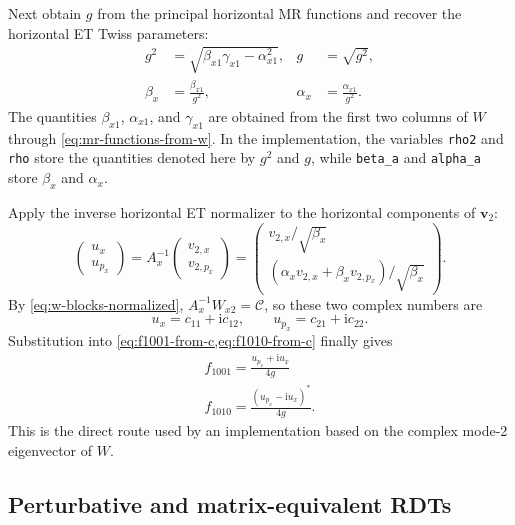 \documentclass[11pt,a4paper]{article}
\newcommand{\ii}{\mathrm{i}}
\newcommand{\mat}[1]{\bm{#1}}
\begin{document}
Next obtain $g$ from the principal horizontal MR functions and recover the
horizontal ET Twiss parameters:
\begin{align}
 g^2
 &=\sqrt{\beta_{x1}\gamma_{x1}-\alpha_{x1}^2},
 &g&=\sqrt{g^2},
 \label{eq:direct-g-from-w}\\
 \beta_x&=\frac{\beta_{x1}}{g^2},
 &\alpha_x&=\frac{\alpha_{x1}}{g^2}.
 \label{eq:direct-et-twiss-from-w}
\end{align}
The quantities $\beta_{x1}$, $\alpha_{x1}$, and $\gamma_{x1}$ are obtained
from the first two columns of $W$ through
\cref{eq:mr-functions-from-w}.  In the implementation, the variables
\texttt{rho2} and \texttt{rho} store the quantities denoted here by $g^2$ and
$g$, while \texttt{beta\_a} and \texttt{alpha\_a} store $\beta_x$ and
$\alpha_x$.

Apply the inverse horizontal ET normalizer to the horizontal components of
$\mat v_2$:
\begin{equation}
 \begin{pmatrix}u_x\\u_{p_x}\end{pmatrix}
 =A_x^{-1}
 \begin{pmatrix}v_{2,x}\\v_{2,p_x}\end{pmatrix}
 =\begin{pmatrix}
  v_{2,x}/\sqrt{\beta_x}\\[0.3em]
  (\alpha_xv_{2,x}+\beta_xv_{2,p_x})/\sqrt{\beta_x}
 \end{pmatrix}.
 \label{eq:direct-normalized-v2}
\end{equation}
By \cref{eq:w-blocks-normalized}, $A_x^{-1}W_{x2}=\mathcal C$, so these two
complex numbers are
\begin{equation}
 u_x=c_{11}+\ii c_{12},
 \qquad
 u_{p_x}=c_{21}+\ii c_{22}.
 \label{eq:direct-c-rows}
\end{equation}
Substitution into \cref{eq:f1001-from-c,eq:f1010-from-c} finally gives
\begin{align}
 \boxed{
 f_{1001}=\frac{u_{p_x}+\ii u_x}{4g}
 }
 \label{eq:direct-f1001-from-w}\\
 \boxed{
 f_{1010}=\frac{(u_{p_x}-\ii u_x)^{*}}{4g}.
 }
 \label{eq:direct-f1010-from-w}
\end{align}
This is the direct route used by an implementation based on the complex
mode-2 eigenvector of $W$.

\subsection{Perturbative and matrix-equivalent RDTs}
\end{document}
